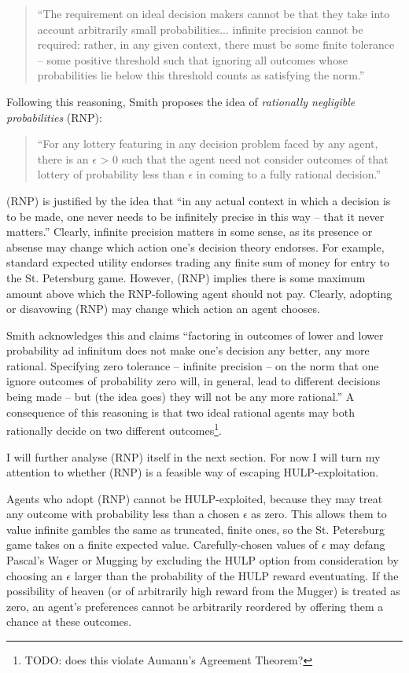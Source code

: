 \documentclass{article}
\begin{document}
\begin{quote}
``The requirement on ideal decision makers cannot be that they take into account arbitrarily small probabilities... infinite precision cannot be required: rather, in any given context, there must be some finite tolerance -- some positive threshold such that ignoring all outcomes whose probabilities lie below this threshold counts as satisfying the norm.''
\end{quote}

Following this reasoning, Smith proposes the idea of \textit{rationally negligible probabilities} (RNP):

\begin{quote}
``For any lottery featuring in any decision problem faced by any agent, there is an \(\epsilon\) > 0 such that the agent need not consider outcomes of that lottery of probability less than \(\epsilon\) in coming to a fully rational decision.''
\end{quote}

(RNP) is justified by the idea that ``in any actual context in which a decision is to be made, one never needs to be infinitely precise in this way -- that it never matters.'' Clearly, infinite precision matters in some sense, as its presence or absense may change which action one's decision theory endorses. For example, standard expected utility endorses trading any finite sum of money for entry to the St. Petersburg game. However, (RNP) implies there is some maximum amount above which the RNP-following agent should not pay. Clearly, adopting or disavowing (RNP) may change which action an agent chooses.

Smith acknowledges this and claims ``factoring in outcomes of lower and lower probability ad infinitum does not make one’s decision any better, any more rational. Specifying zero tolerance -- infinite precision -- on the norm that one ignore outcomes of probability zero will, in general, lead to different decisions being made -- but (the idea goes) they will not be any more rational.'' A consequence of this reasoning is that two ideal rational agents may both rationally decide on two different outcomes\footnote{TODO: does this violate Aumann's Agreement Theorem?}.

I will further analyse (RNP) itself in the next section. For now I will turn my attention to whether (RNP) is a feasible way of escaping HULP-exploitation. 

Agents who adopt (RNP) cannot be HULP-exploited, because they may treat any outcome with probability less than a chosen \(\epsilon\) as zero. This allows them to value infinite gambles the same as truncated, finite ones, so the St. Petersburg game takes on a finite expected value. Carefully-chosen values of \(\epsilon\) may defang Pascal's Wager or Mugging by excluding the HULP option from consideration by choosing an \(\epsilon\) larger than the probability of the HULP reward eventuating. If the possibility of heaven (or of arbitrarily high reward from the Mugger) is treated as zero, an agent's preferences cannot be arbitrarily reordered by offering them a chance at these outcomes.
\end{document}
